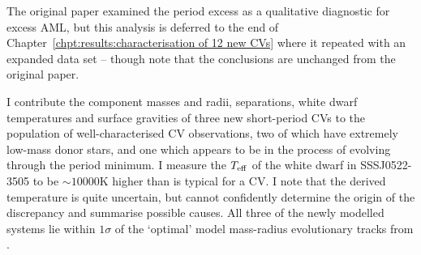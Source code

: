 The original paper \citep{wild2021} examined the period excess as a qualitative diagnostic for excess AML, but this analysis is deferred to the end of Chapter~\ref{chpt:results:characterisation of 12 new CVs} where it repeated with an expanded data set -- though note that the conclusions are unchanged from the original paper.

I contribute the component masses and radii, separations, white dwarf temperatures and surface gravities of three new short-period CVs to the population of well-characterised CV observations, two of which have extremely low-mass donor stars, and one which appears to be in the process of evolving through the period minimum.
I measure the $T_{\rm eff}$ of the white dwarf in SSSJ0522-3505 to be $\sim10000$K higher than is typical for a CV. I note that the derived temperature is quite uncertain, but cannot confidently determine the origin of the discrepancy and summarise possible causes.
All three of the newly modelled systems lie within $1\sigma$ of the `optimal' model mass-radius evolutionary tracks from \citet{knigge11}.
